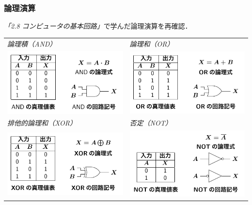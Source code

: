 \documentclass{beamer}                 %
\begin{document}
\begin{frame}
  \frametitle{論理演算}
  \emph{「2.8 コンピュータの基本回路」}で学んだ論理演算を再確認．
  \vfill
  \begin{tabular}{l l}
    \emph{論理積（AND）} & \emph{論理和（OR）}      \\
    \includegraphics[scale=0.7]{../Tikz/and.pdf}    &
    \includegraphics[scale=0.7]{../Tikz/or.pdf}     \\
    \emph{排他的論理和（XOR）} & \emph{否定（NOT）} \\
    \includegraphics[scale=0.7]{../Tikz/xor.pdf}    &
    \includegraphics[scale=0.7]{../Tikz/not.pdf}    \\
  \end{tabular}
  \vfill
\end{frame}
\end{document}
